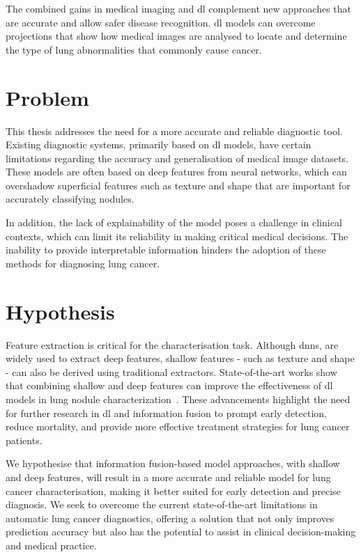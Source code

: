 The combined gains in medical imaging and \ac{dl} complement new approaches that are accurate and allow safer disease recognition. \ac{dl} models can overcome projections that show how medical images are analysed to locate and determine the type of lung abnormalities that commonly cause cancer.


\section{Problem}\label{sec:problem}
This thesis addresses the need for a more accurate and reliable diagnostic tool. Existing diagnostic systems, primarily based on \ac{dl} models, have certain limitations regarding the accuracy and generalisation of medical image datasets. These models are often based on deep features from neural networks, which can overshadow superficial features such as texture and shape that are important for accurately classifying nodules.

In addition, the lack of explainability of the model poses a challenge in clinical contexts, which can limit its reliability in making critical medical decisions. The inability to provide interpretable information hinders the adoption of these methods for diagnosing lung cancer.


\section{Hypothesis}\label{sec:hypothesis}
Feature extraction is critical for the characterisation task. 
Although \acp{dnn}, are widely used to extract deep features, shallow features - such as texture and shape - can also be derived using traditional extractors. State-of-the-art works show that combining shallow and deep features can improve the effectiveness of \ac{dl} models in lung nodule characterization~\cite{xie_fusing_2018}.
These advancements highlight the need for further research in \ac{dl} and information fusion to prompt early detection, reduce mortality, and provide more effective treatment strategies for lung cancer patients.

We hypothesise that information fusion-based model approaches, with shallow and deep features, will result in a more accurate and reliable model for lung cancer characterisation, making it better suited for early detection and precise diagnosis. We seek to overcome the current state-of-the-art limitations in automatic lung cancer diagnostics, offering a solution that not only improves prediction accuracy but also has the potential to assist in clinical decision-making and medical practice.


